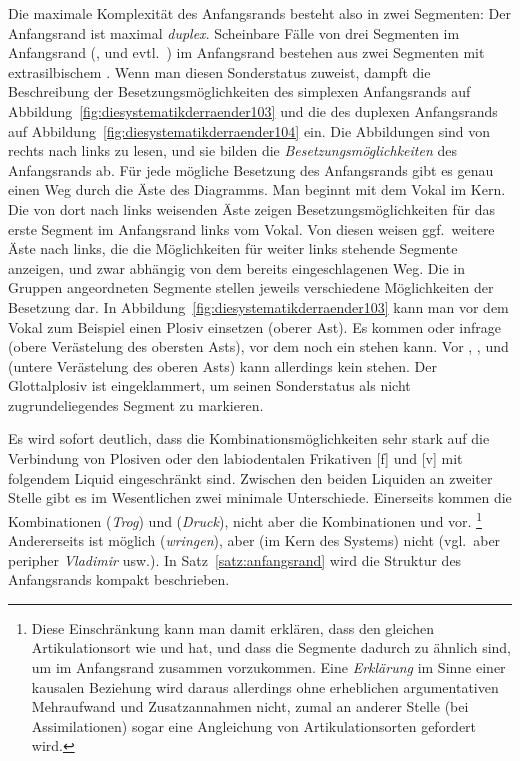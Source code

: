 Die maximale Komplexität des Anfangsrands besteht also in zwei Segmenten:
Der Anfangsrand ist maximal \textit{duplex}.
Scheinbare Fälle von drei Segmenten im Anfangsrand (\textipa{[SpK]}, \textipa{[StK]} und evtl.\ \textipa{[Spl]}) im Anfangsrand bestehen aus zwei Segmenten mit extrasilbischem \textipa{[S]}.
Wenn man \textipa{[S]} diesen Sonderstatus zuweist, dampft die Beschreibung der Besetzungsmöglichkeiten des simplexen Anfangsrands auf Abbildung~\ref{fig:diesystematikderraender103} und die des duplexen Anfangsrands auf Abbildung~\ref{fig:diesystematikderraender104} ein.
Die Abbildungen sind von rechts nach links zu lesen, und sie bilden die \textit{Besetzungsmöglichkeiten} des Anfangsrands ab.
Für jede mögliche Besetzung des Anfangsrands gibt es genau einen Weg durch die Äste des Diagramms.
Man beginnt mit dem Vokal im Kern.
Die von dort nach links weisenden Äste zeigen Besetzungsmöglichkeiten für das erste Segment im Anfangsrand links vom Vokal.
Von diesen weisen ggf.\ weitere Äste nach links, die die Möglichkeiten für weiter links stehende Segmente anzeigen, und zwar abhängig von dem bereits eingeschlagenen Weg.
Die in Gruppen angeordneten Segmente stellen jeweils verschiedene Möglichkeiten der Besetzung dar.
In Abbildung~\ref{fig:diesystematikderraender103} kann man vor dem Vokal zum Beispiel einen Plosiv einsetzen (oberer Ast).
Es kommen \textipa{[p]} oder \textipa{[t]} infrage (obere Verästelung des obersten Asts), vor dem noch ein \textipa{[S]} stehen kann.
Vor \textipa{[b]}, \textipa{[d]}, \textipa{[k]} und \textipa{[g]} (untere Verästelung des oberen Asts) kann allerdings kein \textipa{[S]} stehen.
Der Glottalplosiv \textipa{[P]} ist eingeklammert, um seinen Sonderstatus als nicht zugrundeliegendes Segment zu markieren.

Es wird sofort deutlich, dass die Kombinationsmöglichkeiten sehr stark auf die Verbindung von Plosiven oder den labiodentalen Frikativen [f] und [v] mit folgendem Liquid eingeschränkt sind.
Zwischen den beiden Liquiden an zweiter Stelle gibt es im Wesentlichen zwei minimale Unterschiede.
Einerseits kommen die Kombinationen \textipa{[tK]} (\textit{Trog}) und \textipa{[dK]} (\textit{Druck}), nicht aber die Kombinationen \textipa{[tl]} und \textipa{[dl]} vor.%
\footnote{Diese Einschränkung kann man damit erklären, dass \textipa{[l]} den gleichen Artikulationsort wie \textipa{[t]} und \textipa{[d]} hat, und dass die Segmente dadurch zu ähnlich sind, um im Anfangsrand zusammen vorzukommen.
Eine \textit{Erklärung} im Sinne einer kausalen Beziehung wird daraus allerdings ohne erheblichen argumentativen Mehraufwand und Zusatzannahmen nicht, zumal an anderer Stelle (bei Assimilationen) sogar eine Angleichung von Artikulationsorten gefordert wird.}
Andererseits ist \textipa{[vK]} möglich (\textit{wringen}), aber (im Kern des Systems) nicht \textipa{[vl]} (vgl.\ aber peripher \textit{Vladimir} usw.).
In Satz~\ref{satz:anfangsrand} wird die Struktur des Anfangsrands kompakt beschrieben.

